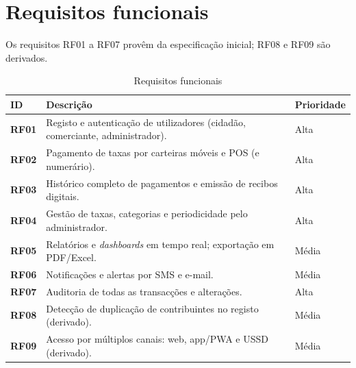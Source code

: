 \documentclass[12pt,a4paper,openany]{report}
\begin{document}
\section{Requisitos funcionais}
Os requisitos RF01 a RF07 provêm da especificação inicial; RF08 e RF09 são derivados.

\begin{table}[!htbp]
\caption{Requisitos funcionais}\label{tab:rf}
\begingroup\singlespacing\small
\begin{tabularx}{\textwidth}{@{}>{\bfseries}p{1.3cm}Xp{2.2cm}@{}}
\toprule
ID & Descrição & Prioridade \\
\midrule
RF01 & Registo e autenticação de utilizadores (cidadão, comerciante, administrador). & Alta \\
RF02 & Pagamento de taxas por carteiras móveis e POS (e numerário). & Alta \\
RF03 & Histórico completo de pagamentos e emissão de recibos digitais. & Alta \\
RF04 & Gestão de taxas, categorias e periodicidade pelo administrador. & Alta \\
RF05 & Relatórios e \emph{dashboards} em tempo real; exportação em PDF/Excel. & Média \\
RF06 & Notificações e alertas por SMS e e-mail. & Média \\
RF07 & Auditoria de todas as transacções e alterações. & Alta \\
RF08 & Detecção de duplicação de contribuintes no registo (derivado). & Média \\
RF09 & Acesso por múltiplos canais: web, app/PWA e USSD (derivado). & Média \\
\bottomrule
\end{tabularx}
\endgroup
\end{table}
\end{document}
